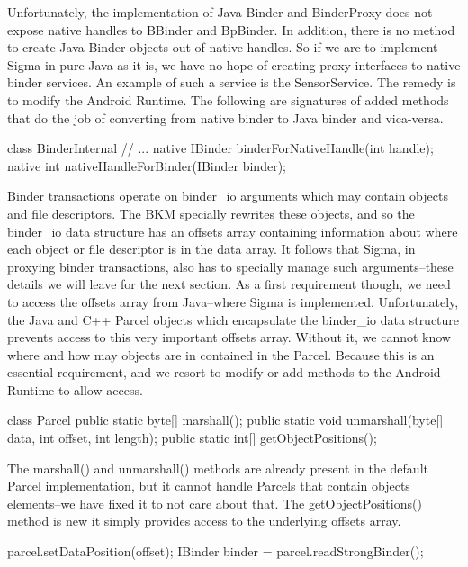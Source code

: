 \documentclass[prodmode]{acmlarge}
\begin{document}
Unfortunately, the implementation of Java Binder and BinderProxy does not expose native handles to BBinder and BpBinder. In addition, there is no method to create Java Binder objects out of native handles. So if we are to implement Sigma in pure Java as it is, we have no hope of creating proxy interfaces to native binder services. An example of such a service is the SensorService. The remedy is to modify the Android Runtime. The following are signatures of added methods that do the job of converting from native binder to Java binder and vica-versa.

\begin{snippet}
class BinderInternal {
  // ...
  native IBinder binderForNativeHandle(int handle);
  native int nativeHandleForBinder(IBinder binder);
}
\end{snippet}

Binder transactions operate on binder\_io arguments which may contain objects and file descriptors. The BKM specially rewrites these objects, and so the binder\_io data structure has an offsets array containing information about where each object or file descriptor is in the data array. It follows that Sigma, in proxying binder transactions, also has to specially manage such arguments--these details we will leave for the next section. As a first requirement though, we need to access the offsets array from Java--where Sigma is implemented. Unfortunately, the Java and C++ Parcel objects which encapsulate the binder\_io data structure prevents access to this very important offsets array. Without it, we cannot know where and how may objects are in contained in the Parcel. Because this is an essential requirement, and we resort to modify or add methods to the Android Runtime to allow access.

\begin{snippet}
class Parcel {
  public static byte[] marshall();
  public static void unmarshall(byte[] data, int offset, int length);
  public static int[] getObjectPositions();
}
\end{snippet}

The marshall() and unmarshall() methods are already present in the default Parcel implementation, but it cannot handle Parcels that contain objects elements--we have fixed it to not care about that. The getObjectPositions() method is new it simply provides access to the underlying offsets array.

\begin{snippet}
parcel.setDataPosition(offset);
IBinder binder = parcel.readStrongBinder();
\end{snippet}
\end{document}
